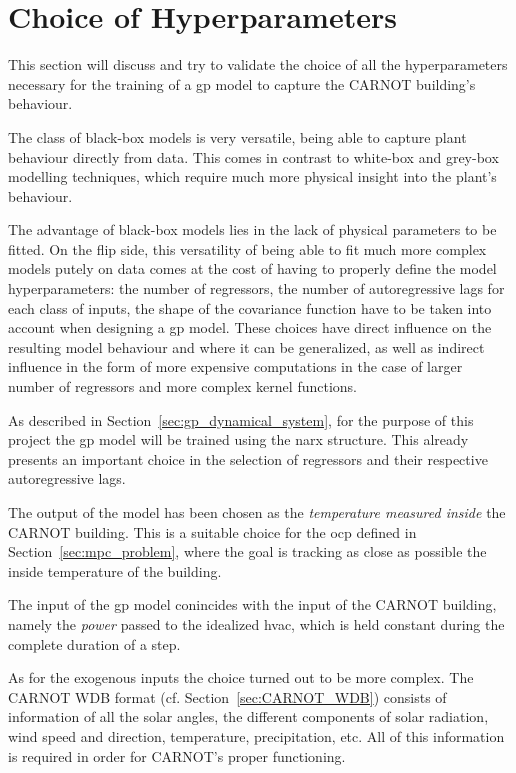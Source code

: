 \section{Choice of Hyperparameters}

This section will discuss and try to validate the choice of all the
hyperparameters necessary for the training of a \acrshort{gp} model to capture
the CARNOT building's behaviour.

The class of black-box models is very versatile, being able to capture plant
behaviour directly from data. This comes in contrast to white-box and grey-box
modelling techniques, which require much more physical insight into the plant's
behaviour.

The advantage of black-box models lies in the lack of physical parameters to be
fitted. On the flip side, this versatility of being able to fit much more
complex models putely on data comes at the cost of having to properly define the
model hyperparameters: the number of regressors, the number of autoregressive
lags for each class of inputs, the shape of the covariance function have to be
taken into account when designing a \acrshort{gp} model. These choices have
direct influence on the resulting model behaviour and where it can be
generalized, as well as indirect influence in the form of more expensive
computations in the case of larger number of regressors and more complex kernel
functions.

As described in Section~\ref{sec:gp_dynamical_system}, for the purpose of this
project the \acrlong{gp} model will be trained using the \acrshort{narx}
structure. This already presents an important choice in the selection of
regressors and their respective autoregressive lags.

The output of the model has been chosen as the \textit{temperature measured
inside} the CARNOT building. This is a suitable choice for the \acrshort{ocp}
defined in Section~\ref{sec:mpc_problem}, where the goal is tracking as close as
possible the inside temperature of the building.

The input of the \acrshort{gp} model conincides with the input of the CARNOT
building, namely the \textit{power} passed to the idealized \acrshort{hvac},
which is held constant during the complete duration of a step.

As for the exogenous inputs the choice turned out to be more complex. The CARNOT
WDB format (cf. Section~\ref{sec:CARNOT_WDB}) consists of information of all the
solar angles, the different components of solar radiation, wind speed and
direction, temperature, precipitation, etc. All of this information is required
in order for CARNOT's proper functioning. 

